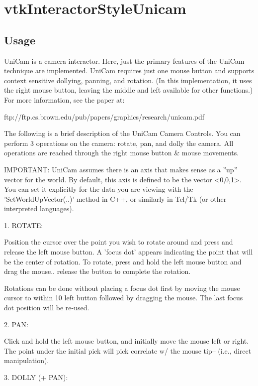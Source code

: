 \section{vtkInteractorStyleUnicam}

\subsection{Usage}

 UniCam is a camera interactor.  Here, just the primary features of the
 UniCam technique are implemented.  UniCam requires just one mouse button
 and supports context sensitive dollying, panning, and rotation.  (In this
 implementation, it uses the right mouse button, leaving the middle and
 left available for other functions.) For more information, see the paper
 at:
 
    ftp://ftp.cs.brown.edu/pub/papers/graphics/research/unicam.pdf
 
 The following is a brief description of the UniCam Camera Controls.  You
 can perform 3 operations on the camera: rotate, pan, and dolly the camera.
 All operations are reached through the right mouse button \& mouse
 movements.
 
 IMPORTANT: UniCam assumes there is an axis that makes sense as a ''up''
 vector for the world.  By default, this axis is defined to be the
 vector <0,0,1>.  You can set it explicitly for the data you are
 viewing with the 'SetWorldUpVector(..)' method in C++, or similarly
 in Tcl/Tk (or other interpreted languages).
 
 1. ROTATE:
 
 Position the cursor over the point you wish to rotate around and press and
 release the left mouse button.  A 'focus dot' appears indicating the
 point that will be the center of rotation.  To rotate, press and hold the
 left mouse button and drag the mouse.. release the button to complete the
 rotation.
 
 Rotations can be done without placing a focus dot first by moving the
 mouse cursor to within 10%
 left button followed by dragging the mouse.  The last focus dot position
 will be re-used.
 
 2. PAN:
 
 Click and hold the left mouse button, and initially move the mouse left
 or right.  The point under the initial pick will pick correlate w/ the
 mouse tip-- (i.e., direct manipulation).
 
 3. DOLLY (+ PAN):
 
